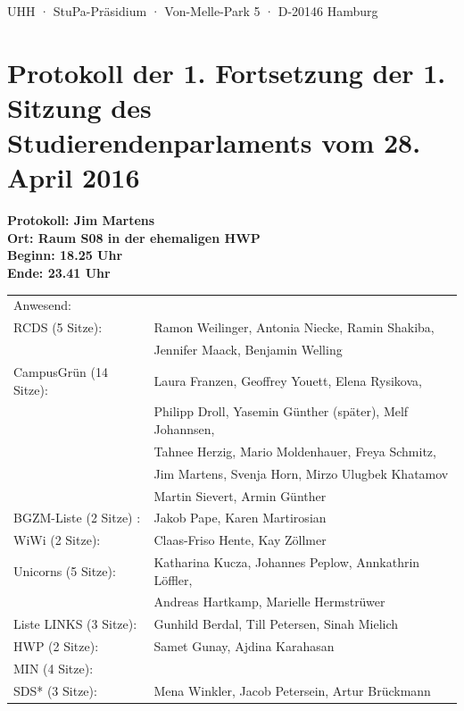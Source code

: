 \documentclass[ngerman,headheight=70pt]{scrartcl}
\begin{document}
    UHH · StuPa-Präsidium · Von-Melle-Park 5 · D-20146 Hamburg

    \section*{Protokoll der 1. Fortsetzung der 1. Sitzung des Studierendenparlaments vom 28. April 2016}

    \textbf{Protokoll: Jim Martens}\\
    \textbf{Ort: Raum S08 in der ehemaligen HWP }\\
    \textbf{Beginn: 18.25 Uhr}\\
    \textbf{Ende: 23.41 Uhr}

    \vspace{0.5cm}
    \begin{tabular}{ll}
        Anwesend: & \\
            RCDS (5 Sitze): & Ramon Weilinger, Antonia Niecke, Ramin Shakiba, \\
                            & Jennifer Maack, Benjamin Welling \\
             CampusGrün (14 Sitze): & Laura Franzen, Geoffrey Youett, Elena Rysikova, \\
                                   & Philipp Droll, Yasemin Günther (später), Melf Johannsen,\\
                                   & Tahnee Herzig, Mario Moldenhauer, Freya Schmitz, \\
                                   & Jim Martens, Svenja Horn, Mirzo Ulugbek Khatamov \\
                                   & Martin Sievert, Armin Günther \\
             BGZM-Liste (2 Sitze) : & Jakob Pape, Karen Martirosian \\
             WiWi (2 Sitze): & Claas-Friso Hente, Kay Zöllmer \\
             Unicorns (5 Sitze): & Katharina Kucza, Johannes Peplow, Annkathrin Löffler, \\
                                 & Andreas Hartkamp, Marielle Hermstrüwer \\
             Liste LINKS (3 Sitze): & Gunhild Berdal, Till Petersen, Sinah Mielich \\
             HWP (2 Sitze): & Samet Gunay, Ajdina Karahasan \\
             MIN (4 Sitze): &  \\
             SDS* (3 Sitze): & Mena Winkler, Jacob Petersein, Artur Brückmann \\

\end{tabular}
\end{document}
